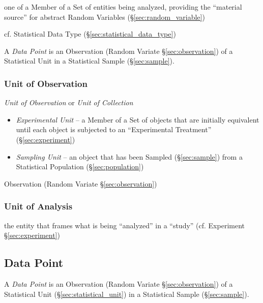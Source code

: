 one of a Member of a Set of entities being analyzed, providing the ``material
source'' for abstract Random Variables (\S\ref{sec:random_variable})

cf. Statistical Data Type (\S\ref{sec:statistical_data_type})

\fist A \emph{Data Point} is an Observation (Random Variate
\S\ref{sec:observation}) of a Statistical Unit in a Statistical Sample
(\S\ref{sec:sample}).



\subsubsection{Unit of Observation}\label{sec:observational_unit}

\emph{Unit of Observation} or \emph{Unit of Collection}

\begin{itemize}
  \item \emph{Experimental Unit} -- a Member of a Set of objects that are
    initially equivalent until each object is subjected to an ``Experimental
    Treatment'' (\S\ref{sec:experiment})
  \item \emph{Sampling Unit} -- an object that has been Sampled
    (\S\ref{sec:sample}) from a Statistical Population (\S\ref{sec:population})
\end{itemize}

\fist Observation (Random Variate \S\ref{sec:observation})



\subsubsection{Unit of Analysis}\label{sec:analysis_unit}

the entity that frames what is being ``analyzed'' in a ``study'' (cf. Experiment
\S\ref{sec:experiment})



\subsection{Data Point}\label{sec:data_point}

A \emph{Data Point} is an Observation (Random Variate \S\ref{sec:observation})
of a Statistical Unit (\S\ref{sec:statistical_unit}) in a Statistical Sample
(\S\ref{sec:sample}).

